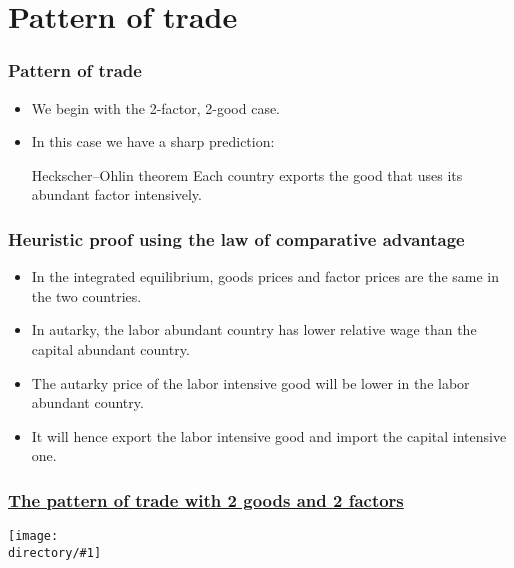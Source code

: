 \documentclass[compress,mathserif,aspectratio=169]{beamer}
\newcommand{\directory}{figures}
\newcommand{\widefigure}[2]{\begin{frame}\frametitle{\hyperlink{#1back}{#2}}\hypertarget{#1}{{\begin{center}\texttt{[image: \\directory/\#1]}\end{center}}}\end{frame}}
\begin{document}
\section{Pattern of trade}\hypertarget{Pattern of trade}{}
\begin{frame}\frametitle{Pattern of trade}\hypertarget{Pattern of trade}{}
\begin{itemize}
\item We begin with the 2-factor, 2-good case.

\item In this case we have a sharp prediction:
\pause


\begin{block}{Heckscher--Ohlin theorem}\hypertarget{Heckscher--Ohlin theorem}{}
Each country exports the good that uses its abundant factor intensively.




\end{block}
\end{itemize}
\end{frame}



\begin{frame}\frametitle{Heuristic proof using the law of comparative advantage}\hypertarget{Heuristic proof using the law of comparative advantage}{}
\begin{itemize}
\item In the integrated equilibrium, goods prices and factor prices are the same in the two countries.

\item In autarky, the labor abundant country has lower relative wage than the capital abundant country.

\item The autarky price of the labor intensive good will be lower in the labor abundant country.

\item It will hence export the labor intensive good and import the capital intensive one.


\end{itemize}
\end{frame}




\widefigure{HK1-3}{The pattern of trade with 2 goods and 2 factors}
\end{document}
